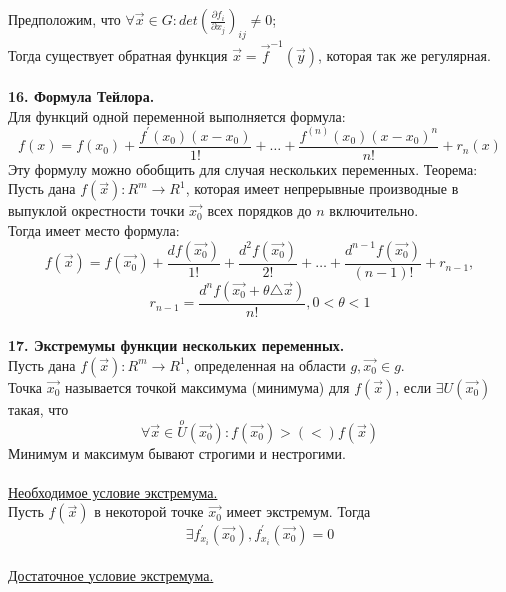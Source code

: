 \documentclass[12pt]{article}
\begin{document}
Предположим, что $\forall \overrightarrow{x} \in G : det(\frac{\partial f_i}{\partial x_j})_{ij} \neq 0$;\\
Тогда существует обратная функция $\overrightarrow{x} = \overrightarrow{f}^{-1}(\overrightarrow{y})$, которая так же регулярная.\\
\\
\label{question16}\textbf{16. Формула Тейлора.}\\
Для функций одной переменной выполняется формула:\\
$$f(x) = f(x_0)+\frac{f^{'}(x_0)(x-x_0)}{1!}+\dots+\frac{f^{(n)}(x_0)(x-x_0)^{n}}{n!}+r_n(x)$$
Эту формулу можно обобщить для случая нескольких переменных. Теорема:\\
Пусть дана $f(\overrightarrow{x}) : R^m\to R^1$, которая имеет непрерывные производные в выпуклой окрестности точки $\overrightarrow{x_0}$ всех порядков до $n$ включительно.\\
Тогда имеет место формула:\\
$$f(\overrightarrow{x}) = f(\overrightarrow{x_0})+\frac{df(\overrightarrow{x_0})}{1!}+\frac{d^2 f(\overrightarrow{x_0})}{2!}+\dots+\frac{d^{n-1} f(\overrightarrow{x_0})}{(n-1)!}+r_{n-1},$$
$$r_{n-1}=\frac{d^n f(\overrightarrow{x_0}+\theta {\bigtriangleup \overrightarrow{x}})}{n!}, 0<\theta<1$$
\\
\label{question17_1}\textbf{17. Экстремумы функции нескольких переменных.}\\
Пусть дана $f(\overrightarrow{x}) : R^m\to R^1$, определенная на области $g, \overrightarrow{x_0} \in g$.\\
Точка $\overrightarrow{x_0}$ называется точкой максимума (минимума) для $f(\overrightarrow{x})$, если $\exists U(\overrightarrow{x_0})$ такая, что\\
$$\forall \overrightarrow{x} \in \overset{o}{U}(\overrightarrow{x_0}) : f(\overrightarrow{x_0}) >(<) f(\overrightarrow{x})$$
Минимум и максимум бывают строгими и нестрогими.\\
\\
\label{question17_2}\uline{Необходимое условие экстремума.}\\
Пусть $f(\overrightarrow{x})$ в некоторой точке $\overrightarrow{x_0}$ имеет экстремум. Тогда\\
$$\exists f_{x_i}^{'}(\overrightarrow{x_0}), f_{x_i}^{'}(\overrightarrow{x_0})=0$$
\\
\label{question17_3}\uline{Достаточное условие экстремума.}\\
\end{document}
